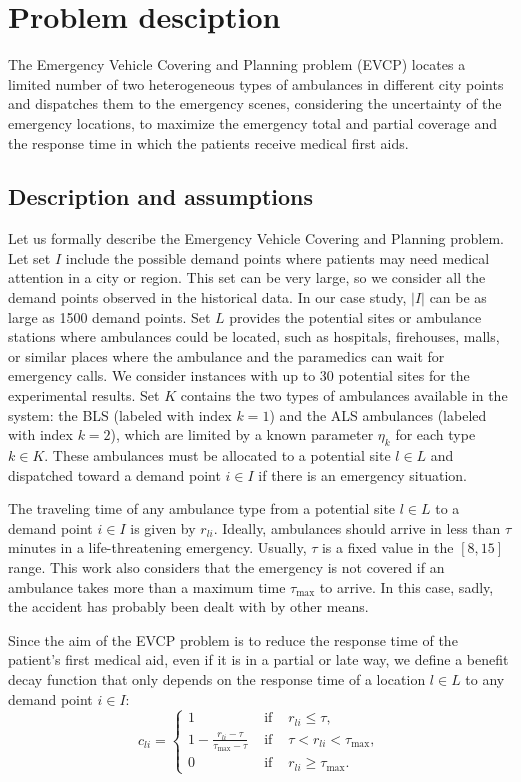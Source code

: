 \chapter{Problem desciption}\label{cap:problem}%
The Emergency Vehicle Covering and Planning problem (EVCP) locates a limited number of two heterogeneous types of ambulances in different city points and dispatches them to the emergency scenes, considering the uncertainty of the emergency locations, to maximize the emergency total and partial coverage and the response time in which the patients receive medical first aids.

\section{Description and assumptions}\label{sec:description}

Let us formally describe the Emergency Vehicle Covering and Planning problem.
Let set $I$ include the possible demand points where patients may need medical attention in a city or region. This set can be very large, so we consider all the demand points observed in the historical data. In our case study, $|I|$ can be as large as 1500 demand points. Set $L$ provides the potential sites or ambulance stations where ambulances could be located, such as hospitals, firehouses, malls, or similar places where the ambulance and the paramedics can wait for emergency calls. We consider instances with up to 30 potential sites for the experimental results. Set $K$ contains the two types of ambulances available in the system: the BLS (labeled with index $k=1$) and the ALS ambulances (labeled with index $k=2$), which are limited by a known parameter $\eta_k$ for each type $k \in K$. These ambulances must be allocated to a potential site $l \in L$ and dispatched toward a demand point $i \in I$ if there is an emergency situation. 

The traveling time of any ambulance type from a potential site $l \in L$ to a demand point $i \in I$ is given by $r_{li}$. Ideally, ambulances should arrive in less than $\tau$ minutes in a life-threatening emergency. Usually, $\tau$ is a fixed value in the $[8,15]$ range. This work also considers that the emergency is not covered if an ambulance takes more than a maximum time $\tau_{\max}$ to arrive. In this case, sadly, the accident has probably been dealt with by other means. 

Since the aim of the EVCP problem is to reduce the response time of the patient's first medical aid, even if it is in a partial or late way, we define a benefit  decay function that only depends on the response time of a location $l\in L$ to any demand point $i\in I$:
   \begin{equation*}
       c_{li} = \left\{ 
        \begin{array}{lcc} 
            1 & \text{ if } & r_{li} \leq \tau, \\ 
            1- \frac{r_{li}-\tau}{\tau_{\max} -\tau}  & \text{ if }  & \tau < r_{li} < \tau_{\max}, \\       
            0 &   \text{ if }  & r_{li} \geq \tau_{\max} .
    \end{array} \right.
   \end{equation*}

